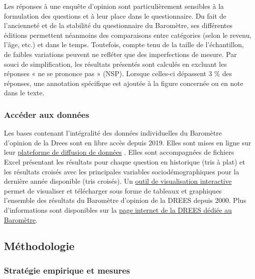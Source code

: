 \documentclass[12pt,a4paper]{reedthesis}
\begin{document}
Les réponses à une enquête d'opinion sont particulièrement sensibles à la formulation des questions et à leur place dans le questionnaire. Du fait de l'ancienneté et de la stabilité du questionnaire du Baromètre, ses différentes éditions permettent néanmoins des comparaisons entre catégories (selon le revenu, l'âge, etc.) et dans le temps. Toutefois, compte tenu de la taille de l'échantillon, de faibles variations peuvent ne refléter que des imperfections de mesure. Par souci de simplification, les résultats présentés sont calculés en excluant les réponses « ne se prononce pas » (NSP). Lorsque celles-ci dépassent 3 \% des réponses, une annotation spécifique est ajoutée à la figure concernée ou en note dans le texte.

\hypertarget{accuxe9der-aux-donnuxe9es}{%
\subsubsection{Accéder aux données}\label{accuxe9der-aux-donnuxe9es}}

Les bases contenant l'intégralité des données individuelles du Baromètre d'opinion de la Drees sont en libre accès depuis 2019. Elles sont mises en ligne sur leur \href{http://www.data.drees.sante.gouv.fr/}{plateforme de diffusion de données} . Elles sont accompagnées de fichiers Excel présentant les résultats pour chaque question en historique (tris à plat) et les résultats croisés avec les principales variables sociodémographiques pour la dernière année disponible (tris croisés). Un \href{http://dataviz.drees.solidarites-sante.gouv.fr/Barometre-DREES}{outil de visualisation interactive} permet de visualiser et télécharger sous forme de tableaux et graphiques l'ensemble des résultats du Baromètre d'opinion de la DREES depuis 2000. Plus d'informations sont disponibles sur la \href{https://drees.solidarites-sante.gouv.fr/etudes-et-statistiques/open-data/aide-et-action-sociale/article/le-barometre-d-opinion-de-la-drees}{page internet de la DREES dédiée au Baromètre}.

\hypertarget{sec:methodo}{%
\subsection{Méthodologie}\label{sec:methodo}}

\hypertarget{sec:mesures}{%
\subsubsection{Stratégie empirique et mesures}\label{sec:mesures}}
\end{document}
